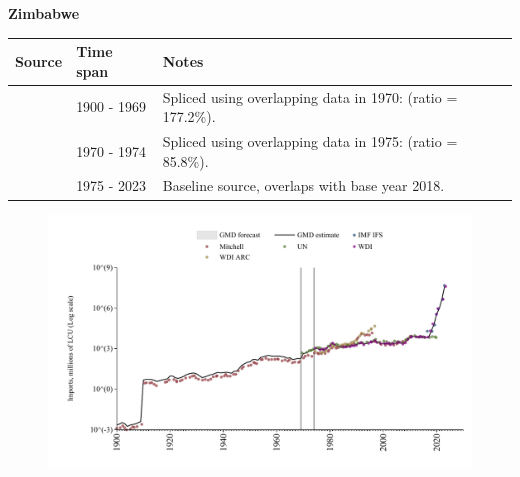 \documentclass[12pt,a4paper,landscape]{article}
\begin{document}
\begin{adjustbox}{max totalsize={\paperwidth}{\paperheight},center}
\begin{minipage}[t][\textheight][t]{\textwidth}
\vspace*{0.5cm}
{}
\begin{center}
{\Large\bfseries Zimbabwe}
\end{center}
\vspace{0.5cm}
\begin{table}[H]
\centering
\small
\begin{tabular}{|l|l|l|}
\hline
\textbf{Source} & \textbf{Time span} & \textbf{Notes} \\
\hline
\rowcolor{white}\cite{Mitchell}& 1900 - 1969 &Spliced using overlapping data in 1970: (ratio = 177.2\%).\\
\rowcolor{lightgray}\cite{UN}& 1970 - 1974 &Spliced using overlapping data in 1975: (ratio = 85.8\%).\\
\rowcolor{white}\cite{WDI}& 1975 - 2023 &Baseline source, overlaps with base year 2018.\\
\hline
\end{tabular}
\end{table}
\begin{figure}[H]
\centering
\includegraphics[width=\textwidth,height=0.6\textheight,keepaspectratio]{graphs/ZWE_imports.pdf}
\end{figure}
\end{minipage}
\end{adjustbox}
\end{document}
